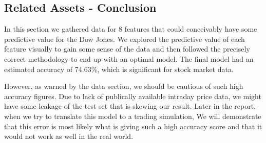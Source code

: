 \documentclass{report}
\begin{document}
\subsection{Related Assets - Conclusion}

In this section we gathered data for 8 features that could conceivably have some predictive value for the Dow Jones. We explored the predictive value of each feature visually to gain some sense of the data and then followed the precisely correct methodology to end up with an optimal model. The final model had an estimated accuracy of 74.63\%, which is significant for stock market data.

However, as warned by the data section, we should be cautious of such high accuracy figures. Due to lack of publically available intraday price data, we might have some leakage of the test set that is skewing our result. Later in the report, when we try to translate this model to a trading simulation,  We will demonstrate that this error is most likely what is giving such a high accuracy score and that it would not work as well in the real world. 



\end{document}
